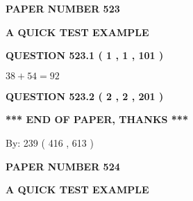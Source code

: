 \documentclass[12pt]{article}
\begin{document}
   
 {\textbf{ \Large{ PAPER NUMBER  523  }}}
   
   
\vspace{0.2in}
   
   
   
   
   
   
 \vspace{0.2in}
{\LARGE {\textbf{ A QUICK TEST EXAMPLE}}}
   
   
  
\vspace{0.2in}
  
{\textbf{\Large{QUESTION
523.1 
 ( 1 , 1 , 101 )
}}}
  
  
 
 

$ %
38 +  %
54=   %
92$
 
 
  
\vspace{0.2in}
  
{\textbf{\Large{QUESTION
523.2 
 ( 2 , 2 , 201 )
}}}
  
  
   
   
 \vspace{0.2in}
 
   
   
   
   
\vspace{1.0in} 
{\textbf{\large{ *** END OF PAPER, THANKS *** }}} 
   
   
\hspace{1.0in} By: 
 239 ( 416 ,  613 )
   
   
   
   
\newpage 
\setcounter{page}{ 
   524001 } 
   
   
   
   
 {\textbf{ \Large{ PAPER NUMBER  524  }}}
   
   
\vspace{0.2in}
   
   
   
   
   
   
 \vspace{0.2in}
{\LARGE {\textbf{ A QUICK TEST EXAMPLE}}}
   
   
  
\vspace{0.2in}
  
\end{document}
